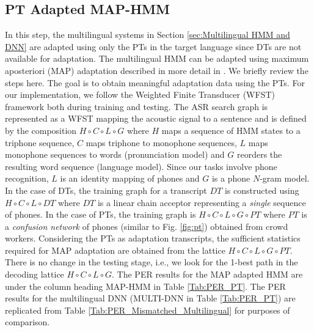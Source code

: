 \documentclass[a4paper]{article}
\begin{document}
\subsection{PT Adapted MAP-HMM} \vspace{-1mm}
\label{sec:PT Adapted MAP-HMM}
In this step, the multilingual systems in Section \ref{sec:Multilingual HMM and DNN} are adapted using only the PTs in the target language since DTs are not available for adaptation. The multilingual HMM can be adapted using maximum aposteriori (MAP) adaptation described in more detail in \cite{Liu-PTAdaptedGMM}. We briefly review the steps here. The goal is to obtain meaningful adaptation data using the PTs. For our implementation, we follow the Weighted Finite Transducer (WFST)~\cite{Mohri-WFST} framework both during training and testing. The ASR search graph is represented as a WFST mapping the acoustic signal to a sentence and is defined by the composition $H \circ C \circ L \circ G$ where $H$ maps a sequence of HMM states to a triphone sequence, $C$ maps triphone to monophone sequences, $L$ maps monophone sequences to words (pronunciation model) and $G$ reorders the resulting word sequence (language model). Since our tasks involve phone recognition, $L$ is an identity mapping of phones and $G$ is a phone $N$-gram model. In the case of DTs, the training graph for a transcript $DT$ is constructed using $H \circ C \circ L \circ DT$ where $DT$ is a linear chain acceptor representing a \emph{single} sequence of phones. In the case of PTs, the training graph is $H \circ C \circ L \circ G \circ PT$ where $PT$ is a \emph{confusion network} of phones (similar to Fig. \ref{fig:pt}) obtained from crowd workers. Considering the PTs as adaptation transcripts, the sufficient statistics required for MAP adaptation are obtained from the lattice  $H \circ C \circ L \circ G \circ PT$. There is no change in the testing stage, i.e., we look for the 1-best path in the decoding lattice $H \circ C \circ L \circ G$. The PER results for the MAP adapted HMM are under the column heading MAP-HMM in Table \ref{Tab:PER_PT}. The PER results for the multilingual DNN (MULTI-DNN in Table \ref{Tab:PER_PT}) are replicated from Table \ref{Tab:PER_Mismatched_Multilingual} for purposes of comparison.
\end{document}
